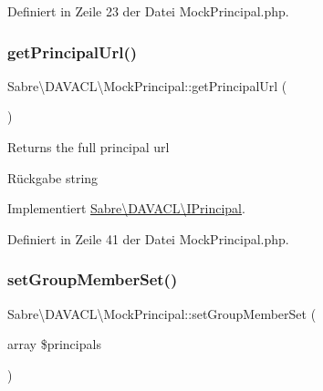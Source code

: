 Definiert in Zeile 23 der Datei Mock\+Principal.\+php.

\mbox{\label{class_sabre_1_1_d_a_v_a_c_l_1_1_mock_principal_a41a75dafe4ec09a4570812cf6c8d2c3d}} 
\subsubsection{\texorpdfstring{get\+Principal\+Url()}{getPrincipalUrl()}}
{\footnotesize\ttfamily Sabre\textbackslash{}\+D\+A\+V\+A\+C\+L\textbackslash{}\+Mock\+Principal\+::get\+Principal\+Url (\begin{DoxyParamCaption}{ }\end{DoxyParamCaption})}

Returns the full principal url

\begin{DoxyReturn}{Rückgabe}
string 
\end{DoxyReturn}


Implementiert \mbox{\hyperlink{interface_sabre_1_1_d_a_v_a_c_l_1_1_i_principal_ae3fc8f13f54eb5daba7416068c685298}{Sabre\textbackslash{}\+D\+A\+V\+A\+C\+L\textbackslash{}\+I\+Principal}}.



Definiert in Zeile 41 der Datei Mock\+Principal.\+php.

\mbox{\label{class_sabre_1_1_d_a_v_a_c_l_1_1_mock_principal_a2b96db589430a20911aac5fca211adba}} 
\subsubsection{\texorpdfstring{set\+Group\+Member\+Set()}{setGroupMemberSet()}}
{\footnotesize\ttfamily Sabre\textbackslash{}\+D\+A\+V\+A\+C\+L\textbackslash{}\+Mock\+Principal\+::set\+Group\+Member\+Set (\begin{DoxyParamCaption}\item[{array}]{\$principals }\end{DoxyParamCaption})}

